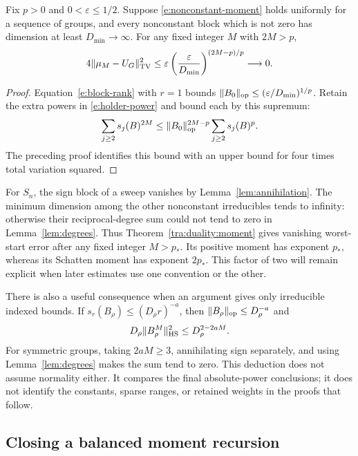 \begin{corollary}\label{e:vanishing-mixing}
Fix $p>0$ and $0<\varepsilon\le1/2$. Suppose \eqref{e:nonconstant-moment} holds uniformly for a sequence of groups, and every nonconstant block which is not zero has dimension at least $D_{\min}\to\infty$. For any fixed integer $M$ with $2M>p$,
\[
 4\|\mu_M-U_G\|_{\mathrm{TV}}^2
 \le\varepsilon\left(\frac{\varepsilon}{D_{\min}}\right)^{(2M-p)/p}
 \longrightarrow0.
\]
\end{corollary}
\begin{proof}
Equation~\eqref{e:block-rank} with $r=1$ bounds
$\|B_0\|_{\mathrm{op}}\le(\varepsilon/D_{\min})^{1/p}$. Retain the extra powers in \eqref{e:holder-power} and bound each by this supremum:
\[
 \sum_{j\ge2}s_j(B)^{2M}
 \le \|B_0\|_{\mathrm{op}}^{2M-p}\sum_{j\ge2}s_j(B)^p.
\]
The preceding proof identifies this bound with an upper bound for four times total variation squared.
\end{proof}
For $S_n$, the sign block of a sweep vanishes by Lemma~\ref{lem:annihilation}. The minimum dimension among the other nonconstant irreducibles tends to infinity: otherwise their reciprocal-degree sum could not tend to zero in Lemma~\ref{lem:degrees}. Thus Theorem~\ref{tra:duality:moment} gives vanishing worst-start error after any fixed integer $M>p_*$. Its positive moment has exponent $p_*$, whereas its Schatten moment has exponent $2p_*$. This factor of two will remain explicit when later estimates use one convention or the other.

There is also a useful consequence when an argument gives only irreducible indexed bounds. If $s_r(B_\rho)\le(D_\rho r)^{-a}$, then $\|B_\rho\|_{\mathrm{op}}\le D_\rho^{-a}$ and
\[
 D_\rho\|B_\rho^M\|_{\mathrm{HS}}^2\le D_\rho^{2-2aM}.
\]
For symmetric groups, taking $2aM\ge3$, annihilating sign separately, and using Lemma~\ref{lem:degrees} makes the sum tend to zero. This deduction does not assume normality either. It compares the final absolute-power conclusions; it does not identify the constants, sparse ranges, or retained weights in the proofs that follow.

\subsection{Closing a balanced moment recursion}

